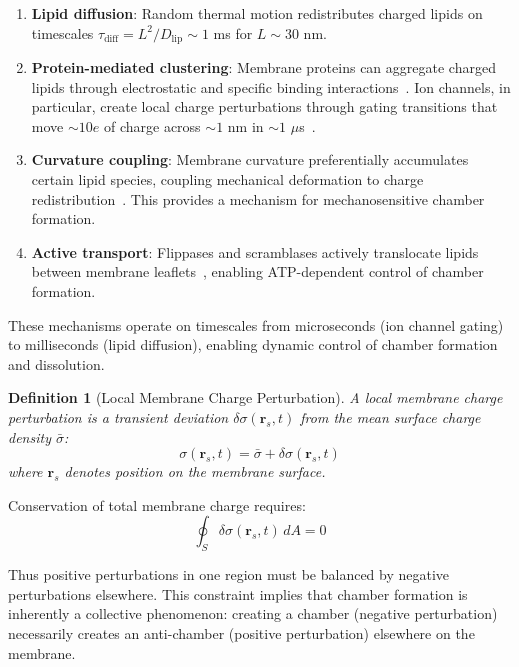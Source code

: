 \documentclass[twocolumn,10pt,aps,prd,superscriptaddress,floatfix,nofootinbib]{revtex4-2}
\newtheorem{definition}[theorem]{Definition}
\theoremstyle{remark}
\begin{document}
\begin{enumerate}
\item \textbf{Lipid diffusion}: Random thermal motion redistributes charged lipids on timescales $\tau_{\mathrm{diff}} = L^2/D_{\mathrm{lip}} \sim 1$ ms for $L \sim 30$ nm.

\item \textbf{Protein-mediated clustering}: Membrane proteins can aggregate charged lipids through electrostatic and specific binding interactions~\cite{McLaughlin2002}. Ion channels, in particular, create local charge perturbations through gating transitions that move $\sim 10e$ of charge across $\sim 1$ nm in $\sim 1$ $\mu$s~\cite{Hille2001}.

\item \textbf{Curvature coupling}: Membrane curvature preferentially accumulates certain lipid species, coupling mechanical deformation to charge redistribution~\cite{McMahon2005}. This provides a mechanism for mechanosensitive chamber formation.

\item \textbf{Active transport}: Flippases and scramblases actively translocate lipids between membrane leaflets~\cite{Devaux1991}, enabling ATP-dependent control of chamber formation.
\end{enumerate}

These mechanisms operate on timescales from microseconds (ion channel gating) to milliseconds (lipid diffusion), enabling dynamic control of chamber formation and dissolution.

\begin{definition}[Local Membrane Charge Perturbation]
\label{def:charge_perturbation}
A local membrane charge perturbation is a transient deviation $\delta\sigma(\mathbf{r}_s, t)$ from the mean surface charge density $\bar{\sigma}$:
\begin{equation}
\sigma(\mathbf{r}_s, t) = \bar{\sigma} + \delta\sigma(\mathbf{r}_s, t)
\end{equation}
where $\mathbf{r}_s$ denotes position on the membrane surface.
\end{definition}

Conservation of total membrane charge requires:
\begin{equation}
\oint_S \delta\sigma(\mathbf{r}_s, t) \, dA = 0
\label{eq:charge_conservation}
\end{equation}

Thus positive perturbations in one region must be balanced by negative perturbations elsewhere. This constraint implies that chamber formation is inherently a collective phenomenon: creating a chamber (negative perturbation) necessarily creates an anti-chamber (positive perturbation) elsewhere on the membrane.
\end{document}
